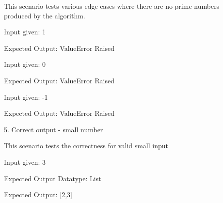 \documentclass[12pt]{article}
\begin{document}
\begin{justify}
This scenario tests various edge cases where there are no prime numbers produced by the algorithm.
\end{justify}\par

\begin{justify}
Input given: 1
\end{justify}\par

\begin{justify}
Expected Output: ValueError Raised
\end{justify}\par

\begin{justify}
Input given: 0
\end{justify}\par

\begin{justify}
Expected Output: ValueError Raised
\end{justify}\par

\begin{justify}
Input given: -1
\end{justify}\par

\begin{justify}
Expected Output: ValueError Raised
\end{justify}\par


\vspace{\baselineskip}
\begin{justify}
5. Correct output - small number
\end{justify}\par

\begin{justify}
This scenario tests the correctness for valid small input
\end{justify}\par

\begin{justify}
Input given: 3
\end{justify}\par

\begin{justify}
Expected Output Datatype: List
\end{justify}\par

\begin{justify}
Expected Output: [2,3]
\end{justify}\par
\end{document}
